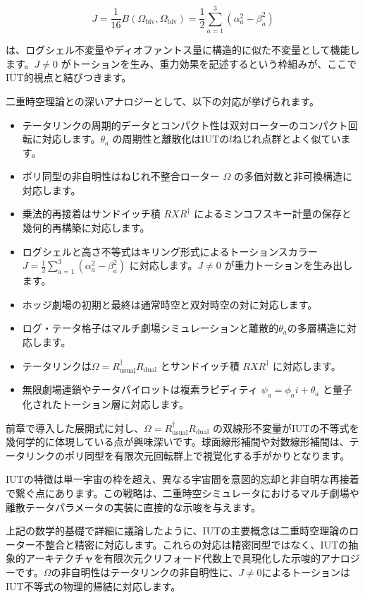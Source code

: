 \documentclass[a4paper,12pt,notitlepage]{jsreport}
\begin{document}
\[
J = \frac{1}{16} B(\Omega_{\text{biv}}, \Omega_{\text{biv}}) = \frac12 \sum_{a=1}^3 (\alpha_a^2 - \beta_a^2)
\]

は、ログシェル不変量やディオファントス量に構造的に似た不変量として機能します。$J \neq 0$ がトーションを生み、重力効果を記述するという枠組みが、ここでIUT的視点と結びつきます。

二重時空理論との深いアナロジーとして、以下の対応が挙げられます。

\begin{itemize}
  \item テータリンクの周期的データとコンパクト性は双対ローターのコンパクト回転に対応します。$\theta_a$ の周期性と離散化はIUTの$l$ねじれ点群とよく似ています。
  \item ポリ同型の非自明性はねじれ不整合ローター $\Omega$ の多価対数と非可換構造に対応します。
  \item 乗法的再接着はサンドイッチ積 $RXR^\dagger$ によるミンコフスキー計量の保存と幾何的再構築に対応します。
  \item ログシェルと高さ不等式はキリング形式によるトーションスカラー $J = \frac12 \sum_{a=1}^3 (\alpha_a^2 - \beta_a^2)$ に対応します。$J \neq 0$ が重力トーションを生み出します。
  \item ホッジ劇場の初期と最終は通常時空と双対時空の対に対応します。
  \item ログ・テータ格子はマルチ劇場シミュレーションと離散的$\theta_a$の多層構造に対応します。
  \item テータリンクは$\Omega = R_{\text{usual}}^\dagger R_{\text{dual}}$ とサンドイッチ積 $RXR^\dagger$ に対応します。
  \item 無限劇場連鎖やテータパイロットは複素ラピディティ $\psi_a = \phi_a i + \theta_a$ と量子化されたトーション層に対応します。
\end{itemize}

前章で導入した展開式に対し、$\Omega = R_{\text{usual}}^\dagger R_{\text{dual}}$ の双線形不変量がIUTの不等式を幾何学的に体現している点が興味深いです。球面線形補間や対数線形補間は、テータリンクのポリ同型を有限次元回転群上で視覚化する手がかりとなります。

IUTの特徴は単一宇宙の枠を超え、異なる宇宙間を意図的忘却と非自明な再接着で繋ぐ点にあります。この戦略は、二重時空シミュレータにおけるマルチ劇場や離散テータパラメータの実装に直接的な示唆を与えます。

上記の数学的基礎で詳細に議論したように、IUTの主要概念は二重時空理論のローター不整合と精密に対応します。これらの対応は精密同型ではなく、IUTの抽象的アーキテクチャを有限次元クリフォード代数上で具現化した示唆的アナロジーです。$\Omega$の非自明性はテータリンクの非自明性に、$J\neq0$によるトーションはIUT不等式の物理的帰結に対応します。
\end{document}
